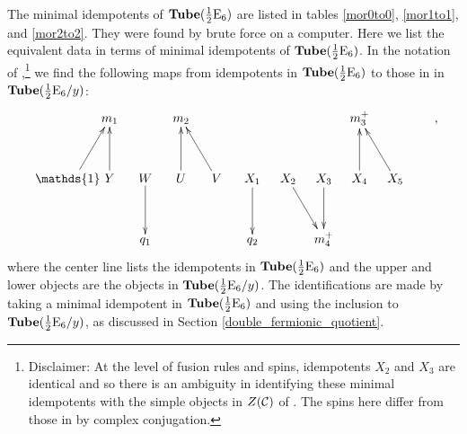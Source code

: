 The minimal idempotents of $\textbf{Tube}(\frac{1}{2}\text{E}_6)$ are listed in tables \ref{mor0to0}, \ref{mor1to1}, and \ref{mor2to2}.
They were found by brute force on a computer.
Here we list the equivalent data in terms of minimal idempotents of $\textbf{Tube}(\frac{1}{2}\text{E}_6)$.
In the notation of \cite{Hong2008},\footnote{Disclaimer: 
At the level of fusion rules and spins,
idempotents $X_2$ and $X_3$ are identical and so there is an ambiguity in identifying these minimal idempotents with the simple objects in $Z(\mathcal{C})$ of \cite{Hong2008}.
The spins here differ from those in \cite{Hong2008} by complex conjugation. } 
we find the following maps from idempotents in $\textbf{Tube}(\frac{1}{2}\text{E}_6)$ to those in in $\textbf{Tube}(\frac{1}{2}\text{E}_6 / y)$:
\begin{align}
\xymatrix @!0 @M=1mm @C=10mm{
& &m_1 && m_2 && &&& m_3^+ &&  \\
 \\
 \quad&\mathds{1} \ar[ruu] \quad & Y \ar[uu] & W\ar[dd] & U\ar[uu] & V \ar[uul] & X_1 \ar[dd] & X_{2}\ar[ddr] &X_{3} \ar[dd] & X_4\ar[uu] & X_5\ar[uul] &  \\
\\
&&&q_1& &&q_2 &&m_4^+& &&  \\
},
\end{align}
where the center line lists the idempotents in $\textbf{Tube}(\frac{1}{2}\text{E}_6)$ and the upper and lower objects are the objects in $\textbf{Tube}(\frac{1}{2}\text{E}_6 / y)$.
The identifications are made by taking a minimal idempotent in $\textbf{Tube}(\frac{1}{2}\text{E}_6)$ and using the inclusion to $\textbf{Tube}(\frac{1}{2}\text{E}_6/y)$, 
as discussed in Section \ref{double_fermionic_quotient}.




